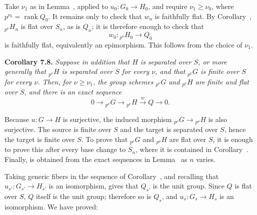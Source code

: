 Take \(\nu_1\) as in Lemma~, applied
to \(u_0:G_0\to H_0\), and require \(\nu_1\geq\nu_0\), where
\(p^{\nu_0}=\operatorname{rank}Q_0\). It remains only to check that \(w_n\)
is faithfully flat. By Corollary~,
\({}_{p^\nu}H_n\) is flat over \(S_n\), as is \(Q_n\); it is therefore
enough to check that
\[
  w_0:{}_{p^\nu}H_0\longrightarrow Q_0
\]
is faithfully flat, equivalently an epimorphism. This follows from the
choice of \(\nu_1\).

\medskip
\noindent{}\textbf{Corollary 7.8.}
\textit{Suppose in addition that \(H\) is separated over \(S\), or more
generally that \({}_{p^\nu}H\) is separated over \(S\) for every \(\nu\),
and that \({}_{p^\nu}G\) is finite over \(S\) for every \(\nu\). Then, for
\(\nu\geq\nu_1\), the group schemes \({}_{p^\nu}G\) and
\({}_{p^\nu}H\) are finite and flat over \(S\), and there is an exact
sequence}
\[
  0\longrightarrow{}_{p^\nu}G
  \longrightarrow{}_{p^\nu}H
  \xrightarrow{\,w\,}Q
  \longrightarrow0.
\]

Because \(u:G\to H\) is surjective, the induced morphism
\({}_{p^\nu}G\to{}_{p^\nu}H\) is also surjective. The source is finite over
\(S\) and the target is separated over \(S\), hence the target is finite
over \(S\). To prove that \({}_{p^\nu}G\) and \({}_{p^\nu}H\) are flat over
\(S\), it is enough to prove this after every base change to \(S_n\), where
it is contained in Corollary~.
Finally,  is obtained from the exact sequences in
Lemma~ as \(n\) varies.

Taking generic fibers in the sequence of
Corollary~, and recalling that
\(u_{s'}:G_{s'}\to H_{s'}\) is an isomorphism, gives that \(Q_{s'}\) is
the unit group. Since \(Q\) is flat over \(S\), \(Q\) itself is the unit
group; therefore so is \(Q_s\), and \(u_s:G_s\to H_s\) is an isomorphism.
We have proved:

